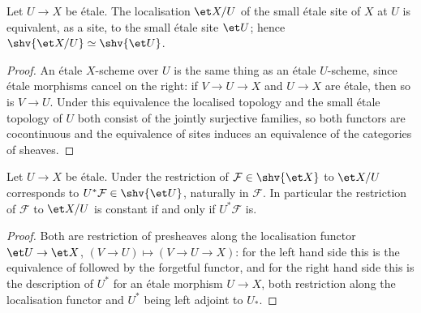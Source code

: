 \begin{lemma}
\label{lemma:constructible-localised-site}
\leanok
Let $U\to X$ be \'etale.  The localisation $\et X/U$ of the small \'etale site
of $X$ at $U$ is equivalent, as a site, to the small \'etale site $\et U$;
hence $\shv{\et X/U}\simeq\shv{\et U}$.
\end{lemma}
\begin{proof}
\leanok
An \'etale $X$-scheme over $U$ is the same thing as an \'etale $U$-scheme,
since \'etale morphisms cancel on the right: if $V\to U\to X$ and $U\to X$
are \'etale, then so is $V\to U$.  Under this equivalence the localised
topology and the small \'etale topology of $U$ both consist of the jointly
surjective families, so both functors are cocontinuous and the equivalence
of sites induces an equivalence of the categories of sheaves.
\end{proof}

\begin{lemma}
\label{lemma:constructible-restriction-upperStar}
\leanok
Let $U\to X$ be \'etale.  Under  the
restriction of $\mathcal F\in\shv{\et X}$ to $\et X/U$ corresponds to
$U^*\mathcal F\in\shv{\et U}$, naturally in $\mathcal F$.  In particular the
restriction of $\mathcal F$ to $\et X/U$ is constant if and only if
$U^*\mathcal F$ is.
\end{lemma}
\begin{proof}
\leanok
Both are restriction of presheaves along the localisation functor
$\et U\to\et X$, $(V\to U)\mapsto(V\to U\to X)$: for the left hand side this
is the equivalence of  followed by
the forgetful functor, and for the right hand side this is the description of
$U^*$ for an \'etale morphism $U\to X$, both restriction along the
localisation functor and $U^*$ being left adjoint to $U_*$.
\end{proof}

